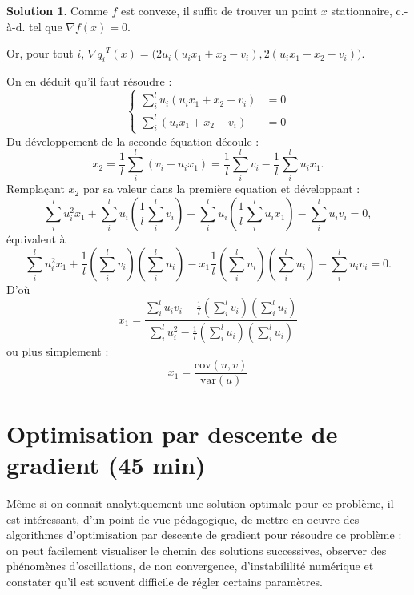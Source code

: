 \documentclass[a4paper,francais]{article}
\newcommand{\cad}{c.-à-d.}
\theoremstyle{definition}
\newtheorem*{solution}{Solution}
\begin{document}
\begin{solution}
  Comme $f$ est convexe, il suffit de trouver un point $x$ stationnaire,
  {\cad} tel que $\nabla f(x) = 0$.

  Or, pour tout $i$, ${\nabla q_i}^T(x) = \big( 2u_i (u_ix_1 + x_2 - v_i), 2(u_ix_1 + x_2 - v_i) \big)$.

  On en déduit qu'il faut résoudre :
  \[
  \left\{
  \begin{array}{cc}
    \sum_i^l u_i (u_ix_1 + x_2 - v_i) &= 0 \\
    \sum_i^l (u_ix_1 + x_2 - v_i) &= 0
  \end{array}
  \right.
  \]
  Du développement de la seconde équation découle :
  \[
  x_2 = \frac{1}{l} \sum_i^l (v_i - u_ix_1) = \frac{1}{l} \sum_i^l v_i - \frac{1}{l} \sum_i^l u_ix_1. 
  \]
  Remplaçant $x_2$ par sa valeur dans la première equation et développant :
  \[
  \sum_i^l u_i^2 x_1 + \sum_i^l u_i (\frac{1}{l} \sum_i^l v_i) - \sum_i^l u_i (\frac{1}{l} \sum_i^l u_ix_1) - \sum_i^l u_iv_i = 0,
  \]
  équivalent à 
  \[
  \sum_i^l u_i^2 x_1 + \frac{1}{l} (\sum_i^l v_i)(\sum_i^l u_i) - x_1 \frac{1}{l} (\sum_i^l u_i)(\sum_i^l u_i)  - \sum_i^l u_iv_i = 0.
  \]
  D'où
  \[
  x_1 = \frac{\sum_i^l u_iv_i - \frac{1}{l} (\sum_i^l v_i)(\sum_i^l u_i)}{\sum_i^l u_i^2 - \frac{1}{l} (\sum_i^l u_i)(\sum_i^l u_i)}
  \]
  ou plus simplement :
  \[
  x_1 = \frac{ \text{cov}(u,v) }{ \text{var}(u) } 
  \]
  
\end{solution}

\section{Optimisation par descente de gradient (45 min)}

Même si on connait analytiquement une solution optimale pour ce problème, il est intéressant,
d'un point de vue pédagogique, de mettre en oeuvre des algorithmes d'optimisation par descente de
gradient pour résoudre ce problème : on peut facilement visualiser le chemin des solutions successives,
observer des phénomènes d'oscillations, de non convergence, d'instabililité numérique et constater
qu'il est souvent difficile de régler certains paramètres.
\end{document}
